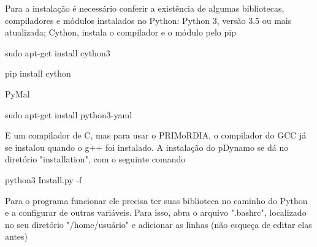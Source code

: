 \documentclass[a4paper,11pt]{refart}
\begin{document}
	Para a instalação é necessário conferir a existência de algumas bibliotecas, compiladores e módulos instalados no Python: Python 3, versão 3.5 ou mais atualizada; Cython, instala o compilador e o módulo pelo pip 
	
\hspace*{-\leftmarginwidth}
\begin{minipage}{\fullwidth}
\begin{commandshell}sudo apt-get install cython3\end{commandshell}
\begin{commandshell}pip install cython\end{commandshell}
\end{minipage}



	PyMal
	
\hspace*{-\leftmarginwidth}
\begin{minipage}{\fullwidth}
	\begin{commandshell}sudo apt-get install python3-yaml\end{commandshell}
\end{minipage}	

	E um compilador de C, mas para usar o PRIMoRDIA, o compilador do GCC já se instalou quando o g++ foi instalado. A instalação do pDynamo se dá no diretório "installation", com o seguinte comando
	

\hspace*{-\leftmarginwidth}
\begin{minipage}{\fullwidth}
	\begin{commandshell}python3 Install.py -f\end{commandshell}
\end{minipage}

	Para o programa funcionar ele precisa ter suas biblioteca no caminho do Python e a configurar de outras variáveis. Para isso, abra o arquivo ".bashrc", localizado no seu diretório "/home/usuário" e adicionar as linhas (não esqueça de editar elas antes)
	
\hspace*{-\leftmarginwidth}
\begin{minipage}{\fullwidth}
\end{minipage}	
	
\end{document}

